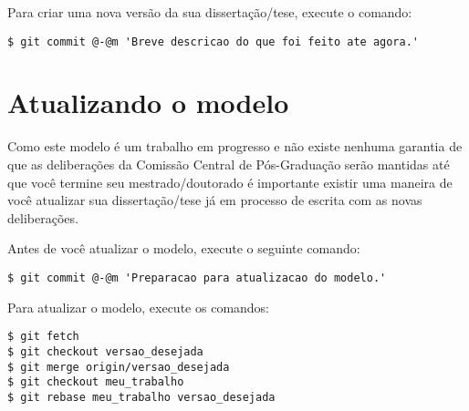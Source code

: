 Para criar uma nova versão da sua dissertação/tese, execute o comando:
\begin{lstlisting}[escapechar=@]
$ git commit @-@m 'Breve descricao do que foi feito ate agora.'
\end{lstlisting}

\section{Atualizando o modelo}
Como este modelo é um trabalho em progresso e não existe nenhuma garantia de que
as deliberações da Comissão Central de Pós-Graduação serão mantidas até que você
termine seu mestrado/doutorado é importante existir uma maneira de você
atualizar sua dissertação/tese já em processo de escrita com as novas
deliberações.

Antes de você atualizar o modelo, execute o seguinte comando:
\begin{lstlisting}[escapechar=@]
$ git commit @-@m 'Preparacao para atualizacao do modelo.'
\end{lstlisting}
Para atualizar o modelo, execute os comandos:
\begin{lstlisting}
$ git fetch
$ git checkout versao_desejada
$ git merge origin/versao_desejada
$ git checkout meu_trabalho
$ git rebase meu_trabalho versao_desejada
\end{lstlisting}
